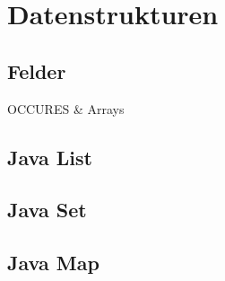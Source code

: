 \section{Datenstrukturen}

\subsection{Felder}
OCCURES \& Arrays

\subsection{Java List}

\subsection{Java Set}

\subsection{Java Map}
